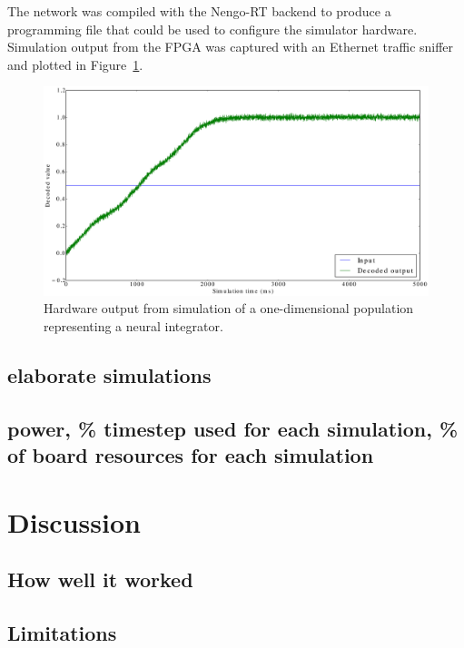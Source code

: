 \documentclass[english]{article}
\newcommand{\design}{Nengo-RT}
\begin{document}
The network was compiled with the \design{} backend to produce a programming file that could be used to configure the simulator hardware.
Simulation output from the FPGA was captured with an Ethernet traffic sniffer and plotted in Figure~\ref{fig:integrator1d}.

\begin{figure}
\centering

\includegraphics[width=6in]{integrator-1d.eps}

\caption[Simulation of a 1D neural integrator.]
{Hardware output from simulation of a one-dimensional population representing a neural integrator.}

\label{fig:integrator1d}
\end{figure}


\subsection{elaborate simulations}

\subsection{power, \% timestep used for each simulation, \% of board resources for each simulation}

\section{Discussion}

\subsection{How well it worked}

\subsection{Limitations}
\end{document}
